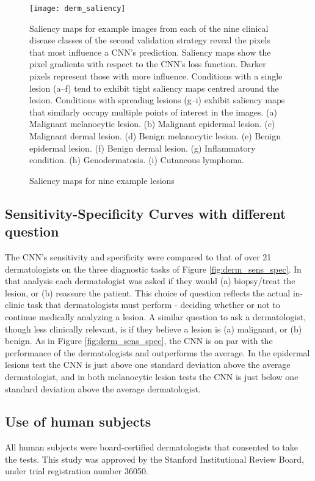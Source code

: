 \begin{figure}
\texttt{[image: derm\_saliency]}
\caption{Saliency maps for nine example lesions}
\vspace{12px}
Saliency maps for example images from each of the nine clinical disease classes of the second validation strategy reveal the pixels that most influence a CNN’s prediction. Saliency maps show the pixel gradients with respect to the CNN’s loss function. Darker pixels represent those with more influence. Conditions with a single lesion (a–f) tend to exhibit tight saliency maps centred around the lesion. Conditions with spreading lesions (g–i) exhibit saliency maps that similarly occupy multiple points of interest in the images. (a) Malignant melanocytic lesion. (b) Malignant epidermal lesion. (c) Malignant dermal lesion. (d) Benign melanocytic lesion. (e) Benign epidermal lesion. (f) Benign dermal lesion. (g) Inflammatory condition. (h) Genodermatosis. (i) Cutaneous lymphoma.
\label{fig:derm_saliency}
\end{figure}

\subsection{Sensitivity-Specificity Curves with different question}
The CNN's sensitivity and specificity were compared to that of over 21 dermatologists on the three diagnostic tasks of Figure \ref{fig:derm_sens_spec}. In that analysis each dermatologist was asked if they would (a) biopsy/treat the lesion, or (b) reassure the patient. This choice of question reflects the actual in-clinic task that dermatologists must perform - deciding whether or not to continue medically analyzing a lesion. A similar question to ask a dermatologist, though less clinically relevant, is if they believe a lesion is (a) malignant, or (b) benign. As in Figure \ref{fig:derm_sens_spec}, the CNN is on par with the performance of the dermatologists and outperforms the average. In the epidermal lesions test the CNN is just above one standard deviation above the average dermatologist, and in both melanocytic lesion tests the CNN is just below one standard deviation above the average dermatologist. 

\subsection{Use of human subjects}
All human subjects were board-certified dermatologists that consented to take the tests. This study was approved by the Stanford Institutional Review Board, under trial registration number 36050.